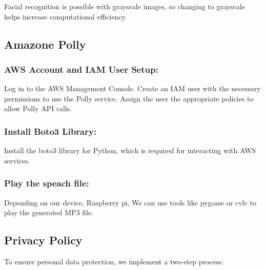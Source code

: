 Facial recognition is possible with grayscale images, so changing to grayscale helps increase computational efficiency.\\

\subsection{\textbf{Amazone Polly}}
\subsubsection{AWS Account and IAM User Setup:}
Log in to the AWS Management Console.
Create an IAM user with the necessary permissions to use the Polly service. Assign the user the appropriate policies to allow Polly API calls.
\subsubsection{Install Boto3 Library:}
Install the boto3 library for Python, which is required for interacting with AWS services.
\subsubsection{Play the speach file:}
Depending on our device, Raspberry pi, We can use tools like pygame or cvlc to play the generated MP3 file.



\subsection{\textbf{Privacy Policy}}
To ensure personal data protection, we implement a two-step process:\\

